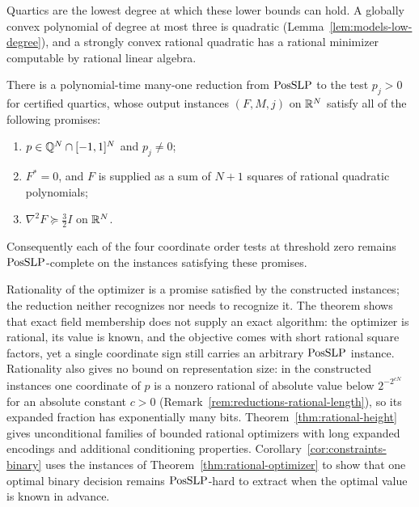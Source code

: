 Quartics are the lowest degree at which these lower bounds can hold. A
globally convex polynomial of degree at most three is quadratic
(Lemma~\ref{lem:models-low-degree}), and a strongly convex rational quadratic
has a rational minimizer computable by rational linear algebra.

\begin{theorem}
\label{thm:rational-optimizer}
There is a polynomial-time many-one reduction from $\mathrm{PosSLP}$ to the test
$p_j>0$ for certified quartics, whose output instances $(F,M,j)$ on $\mathbb R^N$
satisfy all of the following promises:
\begin{enumerate}[label=(\roman*)]
\item $p\in\mathbb Q^N\cap[-1,1]^N$ and $p_j\ne0$;
\item $F^*=0$, and $F$ is supplied as a sum of $N+1$ squares of rational
quadratic polynomials;
\item $\nabla^2F\succeq\frac32I$ on $\mathbb R^N$.
\end{enumerate}
Consequently each of the four coordinate order tests at threshold zero remains
$\mathrm{PosSLP}$-complete on the instances satisfying these promises.
\end{theorem}

Rationality of the optimizer is a promise satisfied by the constructed
instances; the reduction neither recognizes nor needs to recognize it. The
theorem shows that exact field membership does not supply an exact algorithm:
the optimizer is rational, its value is known, and the objective comes with
short rational square factors, yet a single coordinate sign still carries an
arbitrary $\mathrm{PosSLP}$ instance. Rationality also gives no bound on representation
size: in the constructed instances one coordinate of $p$ is a nonzero rational of absolute
value below $2^{-2^{cN}}$ for an absolute constant $c>0$
(Remark~\ref{rem:reductions-rational-length}), so its expanded fraction has
exponentially many bits. Theorem~\ref{thm:rational-height} gives
unconditional families of bounded rational optimizers with long expanded
encodings and additional conditioning properties. Corollary~\ref{cor:constraints-binary}
uses the instances of Theorem~\ref{thm:rational-optimizer} to show that one
optimal binary decision remains $\mathrm{PosSLP}$-hard to extract when the optimal
value is known in advance.

